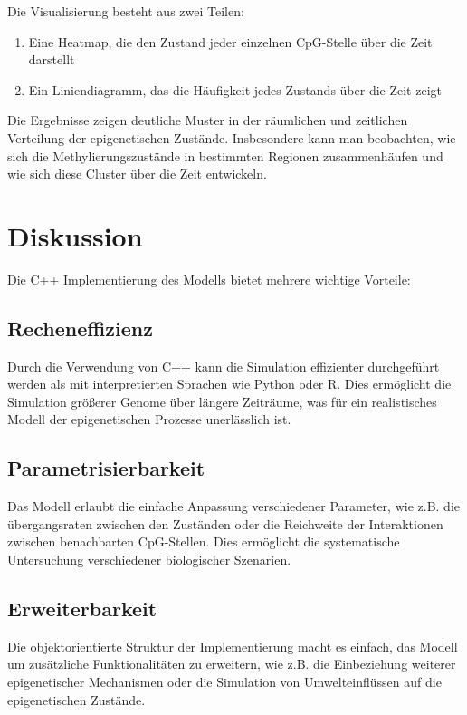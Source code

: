 \documentclass{SeminarV2}
\begin{document}
Die Visualisierung besteht aus zwei Teilen: 
\begin{enumerate}
    \item Eine Heatmap, die den Zustand jeder einzelnen CpG-Stelle {\"u}ber die Zeit darstellt
    \item Ein Liniendiagramm, das die H{\"a}ufigkeit jedes Zustands {\"u}ber die Zeit zeigt
\end{enumerate}

Die Ergebnisse zeigen deutliche Muster in der r{\"a}umlichen und zeitlichen Verteilung der epigenetischen Zust{\"a}nde. Insbesondere kann man beobachten, wie sich die Methylierungszust{\"a}nde in bestimmten Regionen zusammenh{\"a}ufen und wie sich diese Cluster {\"u}ber die Zeit entwickeln.

\section{Diskussion}
Die C++ Implementierung des Modells bietet mehrere wichtige Vorteile:

\subsection{Recheneffizienz}
Durch die Verwendung von C++ kann die Simulation effizienter durchgef{\"u}hrt werden als mit interpretierten Sprachen wie Python oder R. Dies erm{\"o}glicht die Simulation gr{\"o}{\ss}erer Genome {\"u}ber l{\"a}ngere Zeitr{\"a}ume, was f{\"u}r ein realistisches Modell der epigenetischen Prozesse unerl{\"a}sslich ist.

\subsection{Parametrisierbarkeit}
Das Modell erlaubt die einfache Anpassung verschiedener Parameter, wie z.B. die {\"u}bergangsraten zwischen den Zust{\"a}nden oder die Reichweite der Interaktionen zwischen benachbarten CpG-Stellen. Dies erm{\"o}glicht die systematische Untersuchung verschiedener biologischer Szenarien.

\subsection{Erweiterbarkeit}
Die objektorientierte Struktur der Implementierung macht es einfach, das Modell um zus{\"a}tzliche Funktionalit{\"a}ten zu erweitern, wie z.B. die Einbeziehung weiterer epigenetischer Mechanismen oder die Simulation von Umwelteinfl{\"u}ssen auf die epigenetischen Zust{\"a}nde.
\end{document}
